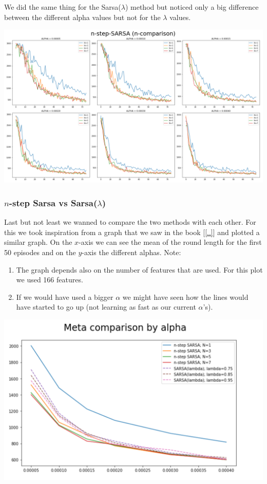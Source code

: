 We did the same thing for the Sarsa($\lambda$) method but noticed only a big difference between the different alpha values but not for the $\lambda$ values.
\begin{center}
\includegraphics[scale=0.22]{graphics/plot08.png}
\end{center}

\subsubsection*{$n$-step Sarsa vs Sarsa($\lambda$)}
Last but not least we wanned to compare the two methods with each other. For this we took inspiration from a graph that we saw in the book [\ref{..}] and plotted a similar graph. On the $x$-axis we can see the mean of the round length for the first 50 episodes and on the $y$-axis the different alphas. Note:
\begin{enumerate}
\item The graph depends also on the number of features that are used. For this plot we used 166 features. 
\item If we would have used a bigger $\alpha$ we might have seen how the lines would have started to go up (not learning as fast as our current $\alpha$'s).
\end{enumerate}
\begin{center}
\includegraphics[scale=0.22]{graphics/plot09.png}
\end{center}


